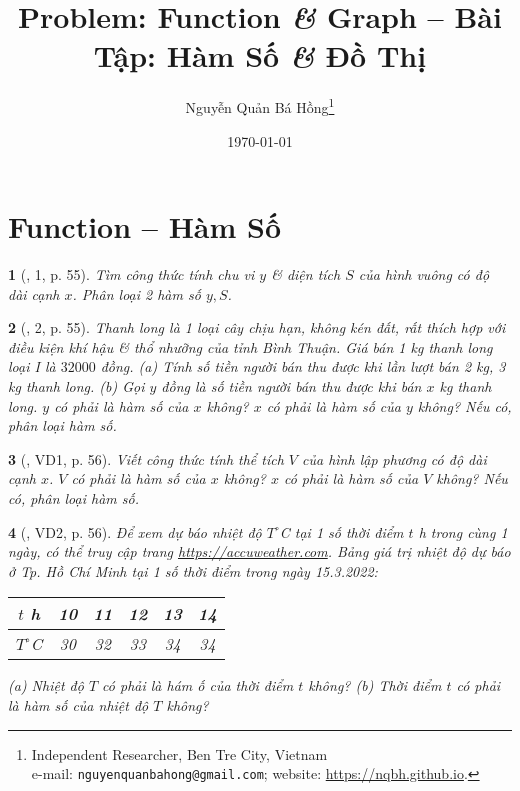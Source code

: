 \documentclass{article}
\title{Problem: Function {\it\&} Graph -- Bài Tập: Hàm Số {\it\&} Đồ Thị}
\author{Nguyễn Quản Bá Hồng\footnote{Independent Researcher, Ben Tre City, Vietnam\\e-mail: \texttt{nguyenquanbahong@gmail.com}; website: \url{https://nqbh.github.io}.}}
\date{\today}
\newtheorem{baitoan}{}
\begin{document}
\maketitle
\tableofcontents


\section{Function -- Hàm Số}

\begin{baitoan}[\cite{SGK_Toan_8_Canh_Dieu_tap_1}, 1, p. 55]
	Tìm công thức tính chu vi $y$ \& diện tích $S$ của hình vuông có độ dài cạnh $x$. Phân loại 2 hàm số $y,S$.
\end{baitoan}

\begin{baitoan}[\cite{SGK_Toan_8_Canh_Dieu_tap_1}, 2, p. 55]
	Thanh long là 1 loại cây chịu hạn, không kén đất, rất thích hợp với điều kiện khí hậu \& thổ nhưỡng của tỉnh Bình Thuận. Giá bán {\rm1 kg} thanh long loại I là $32000$ đồng. (a) Tính số tiền người bán thu được khi lần lượt bán {\rm2 kg, 3 kg} thanh long. (b) Gọi $y$ đồng là số tiền người bán thu được khi bán $x$ {\rm kg} thanh long. $y$ có phải là hàm số của $x$ không? $x$ có phải là hàm số của $y$ không? Nếu có, phân loại hàm số.
\end{baitoan}

\begin{baitoan}[\cite{SGK_Toan_8_Canh_Dieu_tap_1}, VD1, p. 56]
	Viết công thức tính thể tích $V$ của hình lập phương có độ dài cạnh $x$. $V$ có phải là hàm số của $x$ không? $x$ có phải là hàm số của $V$ không? Nếu có, phân loại hàm số.
\end{baitoan}

\begin{baitoan}[\cite{SGK_Toan_8_Canh_Dieu_tap_1}, VD2, p. 56]
	Để xem dự báo nhiệt độ $T^\circ${\rm C} tại 1 số thời điểm $t$ {\rm h} trong cùng 1 ngày, có thể truy cập trang \url{https://accuweather.com}. Bảng giá trị nhiệt độ dự báo ở Tp. Hồ Chí Minh tại 1 số thời điểm trong ngày 15.3.2022:
	\begin{table}[H]
		\centering
		\begin{tabular}{|c|c|c|c|c|c|}
			\hline
			$t$ h & 10 & 11 & 12 & 13 & 14 \\
			\hline
			$T^\circ$C & 30 & 32 & 33 & 34 & 34 \\
			\hline
		\end{tabular}
	\end{table}
	\noindent(a) Nhiệt độ $T$ có phải là hám ố của thời điểm $t$ không? (b) Thời điểm $t$ có phải là hàm số của nhiệt độ $T$ không?
\end{baitoan}
\end{document}
